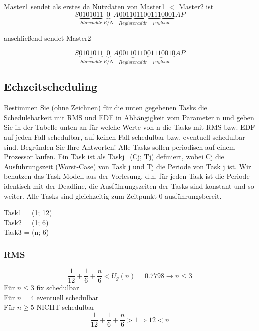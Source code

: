 Master1 sendet als erstes da Nutzdaten von Master1 $<$ Master2 ist
\begin{equation}
  S\underbrace{0101011}_{Slave addr}\underbrace{0}_{R/N}A\underbrace{00110110}_{Register addr}\underbrace{01110001}_{payload}AP
\end{equation}

anschließend sendet Master2

\begin{equation}
  S\underbrace{0101011}_{Slave addr}\underbrace{0}_{R/N}A\underbrace{00110110}_{Register addr}\underbrace{01110010}_{payload}AP
\end{equation}


\subsection{Echzeitscheduling}
Bestimmen Sie (ohne Zeichnen) für die unten gegebenen Tasks die Schedulebarkeit mit RMS und EDF in Abhängigkeit vom 
Parameter n und geben Sie in der Tabelle unten an für welche Werte von n die Tasks mit RMS bzw. EDF auf jeden Fall 
schedulbar, auf keinen Fall schedulbar bzw. eventuell schedulbar sind. 
Begründen Sie Ihre Antworten! Alle Tasks sollen periodisch auf einem Prozessor laufen. Ein Task ist als Taskj=(Cj; Tj) 
definiert, wobei Cj die Ausführungszeit (Worst-Case) von Task j und Tj die Periode von Task j ist. Wir benutzen das 
Task-Modell aus der Vorlesung, d.h. für jeden Task ist die Periode identisch mit der Deadline, die Ausführungszeiten 
der Tasks sind konstant und so weiter. Alle Tasks sind gleichzeitig zum Zeitpunkt 0 ausführungsbereit. 

Task1 = (1; 12)\\
Task2 = (1; 6)\\
Task3 = (n; 6)\\

\subsubsection{RMS}
\begin{equation}
  \frac{1}{12} + \frac{1}{6} + \frac{n}{6} < U_g(n) = 0.7798 \rightarrow n \leq 3
\end{equation}
Für $n \leq 3$ fix schedulbar\\
Für $n = 4$ eventuell schedulbar\\
Für $n \geq 5$ NICHT schedulbar
\begin{equation}
  \frac{1}{12} + \frac{1}{6} + \frac{n}{6} > 1 \Rightarrow 12 < n
\end{equation}

